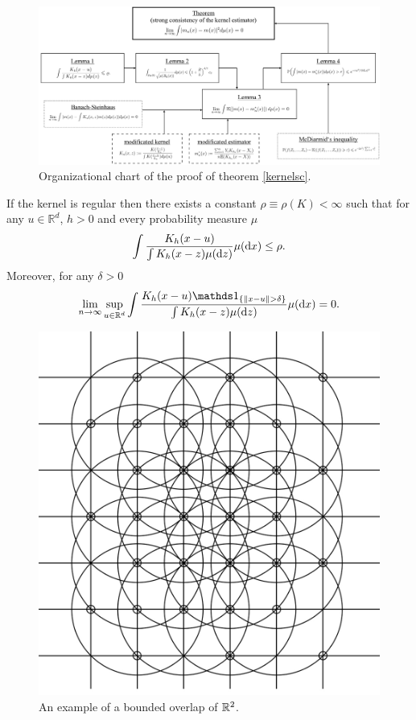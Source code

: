 \begin{figure}[h] 
    \includegraphics[scale=0.155]{organigramkernel.jpeg}
    \centering
    \caption{Organizational chart of the proof of theorem \ref{kernelsc}.} \label{chartkernelproof}
\end{figure}

\begin{lemma} \label{coveringlemma}
If the kernel is regular then there exists a constant $\rho \equiv \rho(K)<\infty$ such that for any $u \in \mathbb{R}^d$, $h>0$ and every probability measure $\mu$ \[\int \frac{K_h(x-u)}{\int K_h(x-z) \mu(\diff{z})} \mu(\dx) \leq \rho.\]
Moreover, for any $\delta > 0$ \[\lim_{n\to\infty} \sup\limits_{u \in \mathbb{R}^d} \int \frac{K_h(x-u) \ind{\{ \| x-u \| > \delta \} }}{\int K_h(x-z) \mu(\diff{z})} \mu(\dx) = 0.\]
\end{lemma}

\begin{figure}[h] 
    \includegraphics[scale=0.18]{coverofR2.jpeg}
    \centering
    \caption{An example of a bounded overlap of $\mathbb{R}^2$.} \label{figboundedoverlap}
\end{figure}

